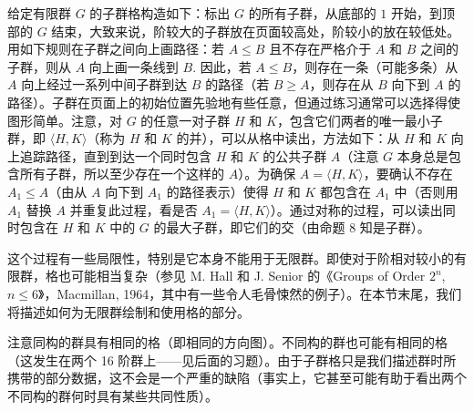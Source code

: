 给定有限群 \(G\) 的子群格构造如下：标出 \(G\) 的所有子群，从底部的 \(1\) 开始，到顶部的 \(G\) 结束，大致来说，阶较大的子群放在页面较高处，阶较小的放在较低处。用如下规则在子群之间向上画路径：若 \(A \leq B\) 且不存在严格介于 \(A\) 和 \(B\) 之间的子群，则从 \(A\) 向上画一条线到 \(B\). 因此，若 \(A \leq B\)，则存在一条（可能多条）从 \(A\) 向上经过一系列中间子群到达 \(B\) 的路径（若 \(B \geq A\)，则存在从 \(B\) 向下到 \(A\) 的路径）。子群在页面上的初始位置先验地有些任意，但通过练习通常可以选择得使图形简单。注意，对 \(G\) 的任意一对子群 \(H\) 和 \(K\)，包含它们两者的唯一最小子群，即 \(\langle H, K \rangle\)（称为 \(H\) 和 \(K\) 的并），可以从格中读出，方法如下：从 \(H\) 和 \(K\) 向上追踪路径，直到到达一个同时包含 \(H\) 和 \(K\) 的公共子群 \(A\)（注意 \(G\) 本身总是包含所有子群，所以至少存在一个这样的 \(A\)）。为确保 \(A = \langle H, K \rangle\)，要确认不存在 \(A_1 \leq A\)（由从 \(A\) 向下到 \(A_1\) 的路径表示）使得 \(H\) 和 \(K\) 都包含在 \(A_1\) 中（否则用 \(A_1\) 替换 \(A\) 并重复此过程，看是否 \(A_1 = \langle H, K \rangle\)）。通过对称的过程，可以读出同时包含在 \(H\) 和 \(K\) 中的 \(G\) 的最大子群，即它们的交（由命题 8 知是子群）。

这个过程有一些局限性，特别是它本身不能用于无限群。即使对于阶相对较小的有限群，格也可能相当复杂（参见 M. Hall 和 J. Senior 的《Groups of Order \(2^n\), \(n \leq 6\)》，Macmillan, 1964，其中有一些令人毛骨悚然的例子）。在本节末尾，我们将描述如何为无限群绘制和使用格的部分。

注意同构的群具有相同的格（即相同的方向图）。不同构的群也可能有相同的格（这发生在两个 16 阶群上——见后面的习题）。由于子群格只是我们描述群时所携带的部分数据，这不会是一个严重的缺陷（事实上，它甚至可能有助于看出两个不同构的群何时具有某些共同性质）。

